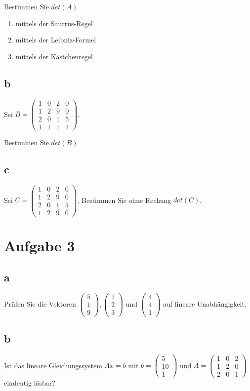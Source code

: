 Bestimmen Sie $det(A)$

\begin{enumerate}
    \item mittels der Saurrus-Regel
    \item mittels der Leibniz-Formel
    \item mittels der Kästchenregel
\end{enumerate}

\subsection{b}
Sei $B = \begin{pmatrix}
    1 & 0 & 2 & 0 \\ 1 & 2 & 9 & 0 \\ 2 & 0 & 1 & 5 \\ 1 & 1 & 1 & 1
\end{pmatrix}$. 

Bestimmen Sie $det(B)$

\subsection{c}
Sei $C = \begin{pmatrix}
    1 & 0 & 2 & 0 \\ 1 & 2 & 9 & 0 \\ 2 & 0 & 1 & 5 \\ 1 & 2 & 9 & 0
\end{pmatrix}$. Bestimmen Sie ohne Rechung $det(C)$.

\section{Aufgabe 3}

\subsection{a}
Prüfen Sie die Vektoren $\begin{pmatrix}5 \\ 1 \\ 9\end{pmatrix}, \begin{pmatrix}1 \\2 \\ 3\end{pmatrix}$ und $\begin{pmatrix}4 \\ 4 \\ 1\end{pmatrix}$ auf lineare Unabhängigkeit.

\subsection{b}
Ist das lineare Gleichungssystem $Ax = b$ mit $b = \begin{pmatrix}5 \\ 10 \\ 1\end{pmatrix}$ und $A = \begin{pmatrix}1 & 0 & 2 \\ 1 & 2 & 0 \\ 2 & 0 & 1\end{pmatrix}$ eindeutig lösbar?

